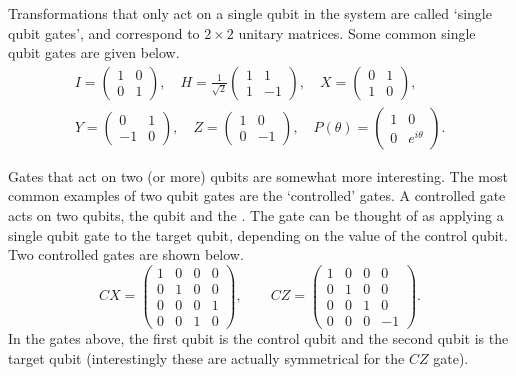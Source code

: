 \documentclass[11pt]{article}
\begin{document}
Transformations that only act on a single qubit in the system are called `single qubit gates', and correspond to $2 \times 2$ unitary matrices. Some common single qubit gates are given below.
\begin{align*}
	I = \begin{pmatrix}
		1 & 0 \\
		0 & 1
	\end{pmatrix},\quad 
	H = \frac{1}{\sqrt{2}}\begin{pmatrix}
		1 & 1 \\ 1 & -1
	\end{pmatrix}, \quad 
	X = \begin{pmatrix}
		0 & 1 \\1 & 0
	\end{pmatrix},\\
	Y = \begin{pmatrix}
		0 & 1 \\
		-1 & 0
	\end{pmatrix}, \quad 
	Z = \begin{pmatrix}
		1 & 0 \\ 0 & -1
	\end{pmatrix}, \quad
	P(\theta) = \begin{pmatrix}
		1 & 0 \\ 0 & e^{i \theta}
	\end{pmatrix}.
\end{align*}


Gates that act on two (or more) qubits are somewhat more interesting. The most common examples of two qubit gates are the `controlled' gates.
A controlled gate acts on two qubits, the  qubit and the . The gate can be thought of as applying a single qubit gate to the target qubit, depending on the value of the control qubit. Two controlled gates are shown below.
$$
	CX = \begin{pmatrix}
		1 & 0 & 0 & 0 \\
		0 & 1 & 0 & 0 \\
		0 & 0 & 0 & 1 \\
		0 & 0 & 1 & 0
	\end{pmatrix}, \quad \quad CZ = \begin{pmatrix}
		1 & 0 & 0 & 0 \\
		0 & 1 & 0 & 0 \\
		0 & 0 & 1 & 0 \\
		0 & 0 & 0 & -1
	\end{pmatrix}.
$$
In the gates above, the first qubit is the control qubit and the second qubit is the target qubit (interestingly these are actually symmetrical for the $CZ$ gate).
\end{document}
